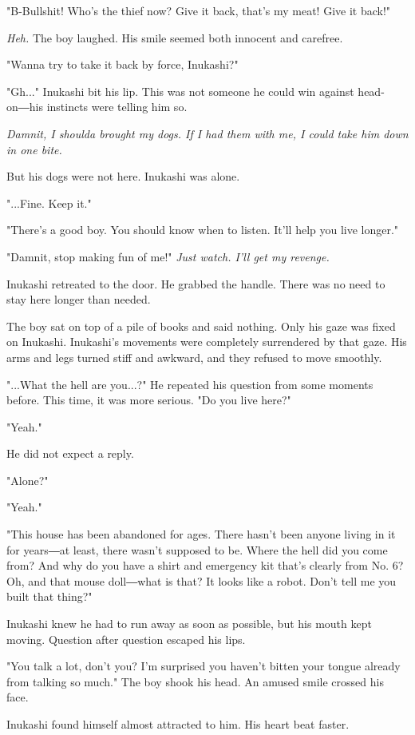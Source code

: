 "B-Bullshit! Who's the thief now? Give it back, that's my meat! Give it
back!"

\emph{Heh.} The boy laughed. His smile seemed both innocent and carefree.

"Wanna try to take it back by force, Inukashi?"

"Gh..." Inukashi bit his lip. This was not someone he could win against
head-on―his instincts were telling him so.

\emph{Damnit, I shoulda brought my dogs. If I had them with me, I could take
him down in one bite.}

But his dogs were not here. Inukashi was alone.

"...Fine. Keep it."

"There's a good boy. You should know when to listen. It'll help you live
longer."

"Damnit, stop making fun of me!" \emph{Just watch. I'll get my revenge.}

Inukashi retreated to the door. He grabbed the handle. There was no need
to stay here longer than needed.

The boy sat on top of a pile of books and said nothing. Only his gaze
was fixed on Inukashi. Inukashi's movements were completely surrendered
by that gaze. His arms and legs turned stiff and awkward, and they
refused to move smoothly.

"...What the hell are you...?" He repeated his question from some
moments before. This time, it was more serious. "Do you live here?"

"Yeah."

He did not expect a reply.

"Alone?"

"Yeah."

"This house has been abandoned for ages. There hasn't been anyone living
in it for years―at least, there wasn't supposed to be. Where the hell
did you come from? And why do you have a shirt and emergency kit that's
clearly from No. 6? Oh, and that mouse doll―what is that? It looks like
a robot. Don't tell me you built that thing?"

Inukashi knew he had to run away as soon as possible, but his mouth kept
moving. Question after question escaped his lips.

"You talk a lot, don't you? I'm surprised you haven't bitten your tongue
already from talking so much." The boy shook his head. An amused smile
crossed his face.

Inukashi found himself almost attracted to him. His heart beat faster.

